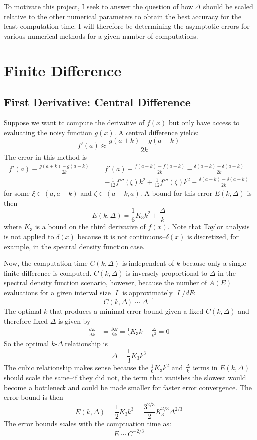 \documentclass[letterpaper,11pt]{article}
\newcommand*{\deriv}[2]{\frac{d #1}{d #2}}
\newcommand*{\pderiv}[2]{\frac{\partial #1}{\partial #2}}
\begin{document}
\begin{flushleft}
    To motivate this project, I seek to answer the question of how $\Delta$ should be scaled relative to the other numerical parameters to obtain the best accuracy for the least computation time. I will therefore be determining the asymptotic errors for various numerical methods for a given number of computations.

    \section{Finite Difference}

    \subsection{First Derivative: Central Difference}
    Suppose we want to compute the derivative of $f(x)$ but only have access to evaluating the noisy function $g(x)$. A central difference yields:
    $$f'(a) \approx \frac{g(a+k) - g(a-k)}{2k}$$
    The error in this method is
    \begin{align*}
        f'(a) - \frac{g(a+k) - g(a-k)}{2k} &= f'(a) - \frac{f(a+k) - f(a-k)}{2k} - \frac{\delta(a+k) - \delta(a-k)}{2k} \\
        &= -\frac{1}{12}f'''(\xi)k^2 + \frac{1}{12}f'''(\zeta)k^2 - \frac{\delta(a+k) - \delta(a-k)}{2k}
    \end{align*}
    for some $\xi \in (a, a+k)$ and $\zeta \in (a-k, a)$. A bound for this error $E(k, \Delta)$ is then
    $$E(k, \Delta) = \frac{1}{6}K_3k^2 + \frac{\Delta}{k}$$
    where $K_3$ is a bound on the third derivative of $f(x)$. Note that Taylor analysis is not applied to $\delta(x)$ because it is not continuous--$\delta(x)$ is discretized, for example, in the spectral density function case.
    
    Now, the computation time $C(k, \Delta)$ is independent of $k$ because only a single finite difference is computed. $C(k, \Delta)$ is inversely proportional to $\Delta$ in the spectral density function scenario, however, because the number of $A(E)$ evaluations for a given interval size $|I|$ is approximately $|I|/dE$:
    $$\boxed{C(k, \Delta) \sim \Delta^{-1}}$$
    The optimal $k$ that produces a minimal error bound given a fixed $C(k, \Delta)$ and therefore fixed $\Delta$ is given by
    \begin{align*}
        \deriv{E}{k} &= \pderiv{E}{k} = \frac{1}{3}K_3k - \frac{\Delta}{k^2} = 0
    \end{align*}
    So the optimal $k$-$\Delta$ relationship is
    $$\boxed{\Delta = \frac{1}{3}K_3k^3}$$
    The cubic relationship makes sense because the $\frac{1}{6}K_3k^2$ and $\frac{\Delta}{k}$ terms in $E(k, \Delta)$ should scale the same--if they did not, the term that vanishes the slowest would become a bottleneck and could be made smaller for faster error convergence. The error bound is then
    $$\boxed{E(k, \Delta) = \frac{1}{2}K_3k^3 = \frac{3^{2/3}}{2}K_3^{2/3}\Delta^{2/3}}$$
    The error bounds scales with the comptuation time as:
    $$\boxed{E \sim C^{-2/3}}$$

\end{flushleft}
\end{document}
